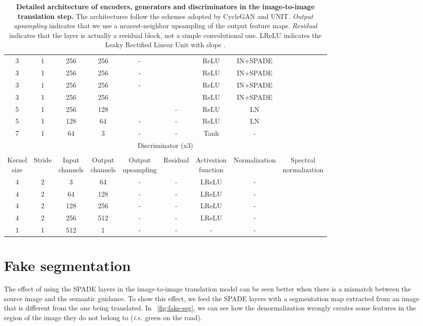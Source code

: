 \documentclass{bmvc2k}
\begin{document}
\begin{table}[htb!]
{\begin{tabular}{ccccccccc}
			3 & 1 & 256 & 256 & - & \checkmark & ReLU & IN+SPADE & \checkmark  \\
			3 & 1 & 256 & 256 & - & \checkmark & ReLU & IN+SPADE & \checkmark  \\
			3 & 1 & 256 & 256 & - & \checkmark & ReLU & IN+SPADE & \checkmark  \\
			3 & 1 & 256 & 256 & \checkmark & \checkmark & ReLU & IN+SPADE & \checkmark  \\
			5 & 1 & 256 & 128 & \checkmark & - & ReLU & LN & \checkmark \\
			5 & 1 & 128 & 64 & - & - & ReLU & LN & \checkmark  \\
			7 & 1 & 64 & 3 & - & - & Tanh & - & \checkmark  \\
			\hline
			\multicolumn{9}{c}{Discriminator (x3)}\\
			\hline
			\\
			\makecell{Kernel\\size} & Stride & \makecell{Input\\channels} & \makecell{Output\\channels} & \makecell{Output\\upsampling} & Residual & \makecell{Activation\\function} & Normalization & \makecell{Spectral\\normalization} \\ \hline
			4 & 2 & 3 & 64 & - & - & LReLU & - & \checkmark  \\
			4 & 2 & 64 & 128 & - & - & LReLU & - & \checkmark  \\
			4 & 2 & 128 & 256 & - & - & LReLU & - & \checkmark  \\
			4 & 2 & 256 & 512 & - & - & LReLU & - & \checkmark  \\
			1 & 1 & 512 & 1 & - & - & - & - & \checkmark  \\
			\hline
		\end{tabular}
	}
	\medskip
	\caption{\textbf{Detailed architecture of encoders, generators and discriminators in the image-to-image translation step.} The architectures follow the schemes adopted by CycleGAN and UNIT. \textit{Output upsampling} indicates that we use a  nearest-neighbor upsampling of the output feature maps. \textit{Residual} indicates that the layer is actually a residual block, not a simple convolutional one. LReLU indicates the Leaky Rectified Linear Unit with slope .}
\end{table}

\newpage

\section{Fake segmentation}
The effect of using the SPADE layers in the image-to-image translation model can be seen better when there is a mismatch between the source image and the semantic guidance. To show this effect, we feed the SPADE layers with a segmentation map extracted from an image that is different from the one being translated. In \figurename~\ref{fig:fake-seg}, we can see how the denormalization wrongly creates some features in the region of the image they do not belong to (\textit{i.e.} green on the road).
\end{document}
